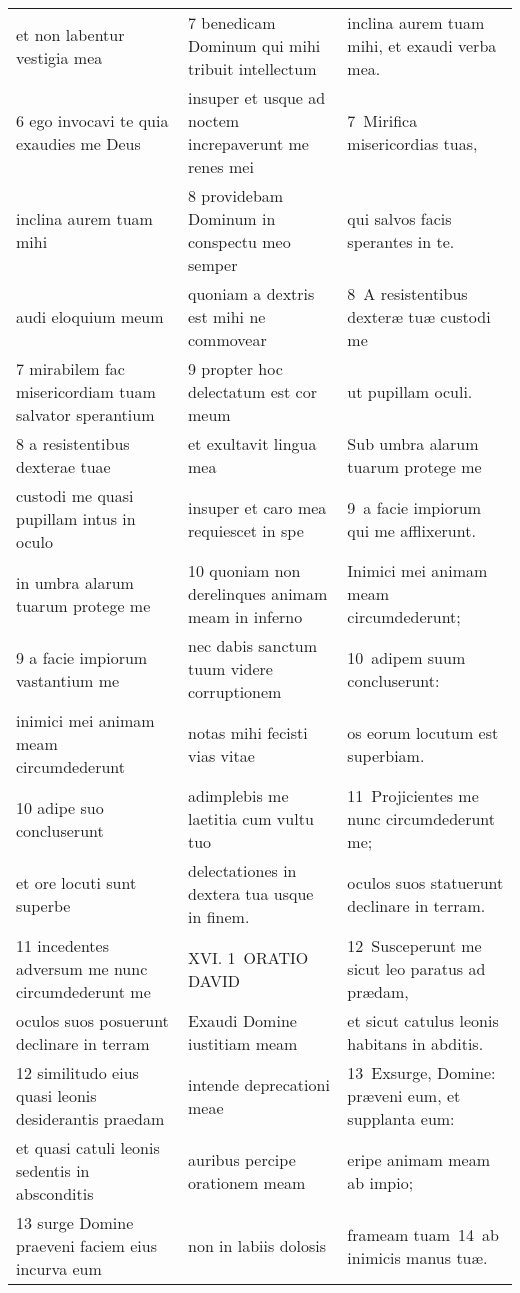 \documentclass{article}
\begin{document}
\begin{longtable}{@{}p{}p{}p{}@{}}
et non labentur vestigia mea	&	7 benedicam Dominum qui mihi tribuit intellectum	&	inclina aurem tuam mihi, et exaudi verba mea.	\\
6 ego invocavi te quia exaudies me Deus	&	insuper et usque ad noctem increpaverunt me renes mei	&	7 Mirifica misericordias tuas,	\\
inclina aurem tuam mihi	&	8 providebam Dominum in conspectu meo semper	&	qui salvos facis sperantes in te.	\\
audi eloquium meum	&	quoniam a dextris est mihi ne commovear	&	8 A resistentibus dexteræ tuæ custodi me	\\
7 mirabilem fac misericordiam tuam salvator sperantium	&	9 propter hoc delectatum est cor meum	&	ut pupillam oculi.	\\
8 a resistentibus dexterae tuae	&	et exultavit lingua mea	&	Sub umbra alarum tuarum protege me	\\
custodi me quasi pupillam intus in oculo	&	insuper et caro mea requiescet in spe	&	9 a facie impiorum qui me afflixerunt.	\\
in umbra alarum tuarum protege me	&	10 quoniam non derelinques animam meam in inferno	&	Inimici mei animam meam circumdederunt;	\\
9 a facie impiorum vastantium me	&	nec dabis sanctum tuum videre corruptionem	&	10 adipem suum concluserunt:	\\
inimici mei animam meam circumdederunt	&	notas mihi fecisti vias vitae	&	os eorum locutum est superbiam.	\\
10 adipe suo concluserunt	&	adimplebis me laetitia cum vultu tuo	&	11 Projicientes me nunc circumdederunt me;	\\
et ore locuti sunt superbe	&	delectationes in dextera tua usque in finem.	&	oculos suos statuerunt declinare in terram.	\\
11 incedentes adversum me nunc circumdederunt me	&	XVI. 1 ORATIO DAVID	&	12 Susceperunt me sicut leo paratus ad prædam,	\\
oculos suos posuerunt declinare in terram	&	Exaudi Domine iustitiam meam	&	et sicut catulus leonis habitans in abditis.	\\
12 similitudo eius quasi leonis desiderantis praedam	&	intende deprecationi meae	&	13 Exsurge, Domine: præveni eum, et supplanta eum:	\\
et quasi catuli leonis sedentis in absconditis	&	auribus percipe orationem meam	&	eripe animam meam ab impio;	\\
13 surge Domine praeveni faciem eius incurva eum	&	non in labiis dolosis	&	frameam tuam 14 ab inimicis manus tuæ.	\\

\end{longtable}
\end{document}
